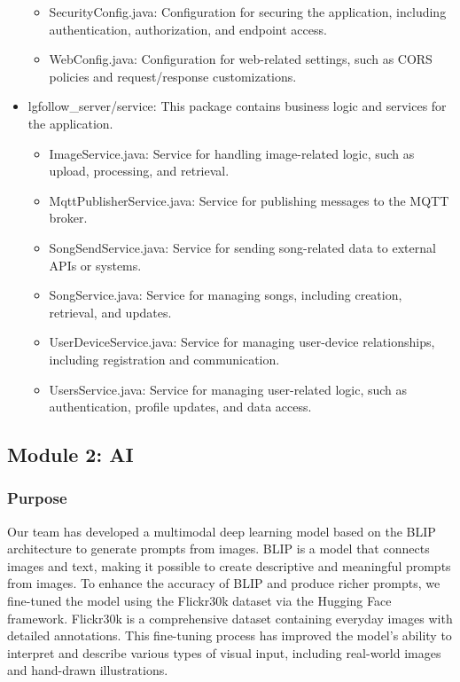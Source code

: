 \documentclass[conference]{IEEEtran}
\begin{document}
\begin{itemize}
    \begin{itemize}
        \item SecurityConfig.java: Configuration for securing the application, including authentication, authorization, and endpoint access. \\
        \item WebConfig.java: Configuration for web-related settings, such as CORS policies and request/response customizations. \\
    \end{itemize}
    \item lgfollow\_server/service: This package contains business logic and services for the application.
    \begin{itemize}
        \item ImageService.java: Service for handling image-related logic, such as upload, processing, and retrieval. \\
        \item MqttPublisherService.java: Service for publishing messages to the MQTT broker. \\
        \item SongSendService.java: Service for sending song-related data to external APIs or systems. \\
        \item SongService.java: Service for managing songs, including creation, retrieval, and updates. \\
        \item UserDeviceService.java: Service for managing user-device relationships, including registration and communication. \\
        \item UsersService.java: Service for managing user-related logic, such as authentication, profile updates, and data access. \\
    \end{itemize}
\end{itemize}

\clearpage

\subsection{Module 2: AI}

\subsubsection{Purpose}
\noindent Our team has developed a multimodal deep learning model based on the BLIP architecture to generate prompts from images. BLIP is a model that connects images and text, making it possible to create descriptive and meaningful prompts from images. To enhance the accuracy of BLIP and produce richer prompts, we fine-tuned the model using the Flickr30k dataset via the Hugging Face framework. Flickr30k is a comprehensive dataset containing everyday images with detailed annotations. This fine-tuning process has improved the model's ability to interpret and describe various types of visual input, including real-world images and hand-drawn illustrations.\\
\end{document}
